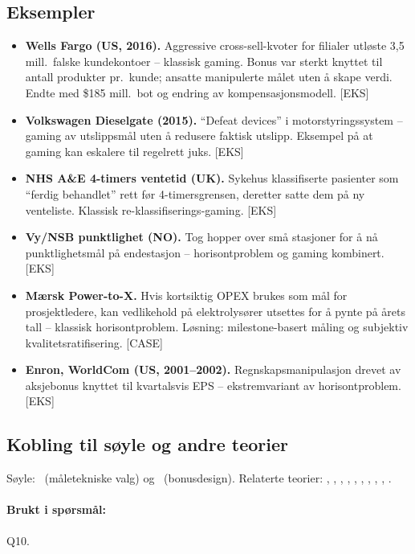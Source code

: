 \subsection*{Eksempler}
\begin{itemize}
\item \textbf{Wells Fargo (US, 2016).} Aggressive cross-sell-kvoter for filialer utløste 3,5 mill.\ falske kundekontoer -- klassisk gaming. Bonus var sterkt knyttet til antall produkter pr.\ kunde; ansatte manipulerte målet uten å skape verdi. Endte med \$185 mill.\ bot og endring av kompensasjonsmodell. [EKS]
\item \textbf{Volkswagen Dieselgate (2015).} ``Defeat devices'' i motorstyringssystem -- gaming av utslippsmål uten å redusere faktisk utslipp. Eksempel på at gaming kan eskalere til regelrett juks. [EKS]
\item \textbf{NHS A\&E 4-timers ventetid (UK).} Sykehus klassifiserte pasienter som ``ferdig behandlet'' rett før 4-timersgrensen, deretter satte dem på ny venteliste. Klassisk re-klassifiserings-gaming. [EKS]
\item \textbf{Vy/NSB punktlighet (NO).} Tog hopper over små stasjoner for å nå punktlighetsmål på endestasjon -- horisontproblem og gaming kombinert. [EKS]
\item \textbf{Mærsk Power-to-X.} Hvis kortsiktig OPEX brukes som mål for prosjektledere, kan vedlikehold på elektrolysører utsettes for å pynte på årets tall -- klassisk horisontproblem. Løsning: milestone-basert måling og subjektiv kvalitetsratifisering. [CASE]
\item \textbf{Enron, WorldCom (US, 2001--2002).} Regnskapsmanipulasjon drevet av aksjebonus knyttet til kvartalsvis EPS -- ekstremvariant av horisontproblem. [EKS]
\end{itemize}

\subsection*{Kobling til søyle og andre teorier}
Søyle: \STwo\ (måletekniske valg) og \SThree\ (bonusdesign). Relaterte teorier: , , , , , , , , , .

\paragraph{Brukt i spørsmål:} Q10.
